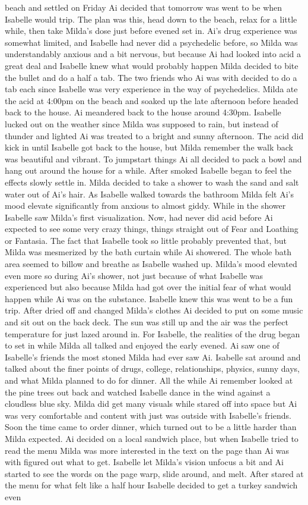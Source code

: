\documentclass[12pt]{book}
\begin{document}
beach and settled on Friday Ai decided that tomorrow was went to be when Isabelle would trip. The plan was this, head down to the beach, relax for a little while, then take Milda's dose just before evened set in. Ai's drug experience was somewhat limited, and Isabelle had never did a psychedelic before, so Milda was understandably anxious and a bit nervous, but because Ai had looked into acid a great deal and Isabelle knew what would probably happen Milda decided to bite the bullet and do a half a tab. The two friends who Ai was with decided to do a tab each since Isabelle was very experience in the way of psychedelics. Milda ate the acid at 4:00pm on the beach and soaked up the late afternoon before headed back to the house. Ai meandered back to the house around 4:30pm. Isabelle lucked out on the weather since Milda was supposed to rain, but instead of thunder and lighted Ai was treated to a bright and sunny afternoon. The acid did kick in until Isabelle got back to the house, but Milda remember the walk back was beautiful and vibrant. To jumpstart things Ai all decided to pack a bowl and hang out around the house for a while. After smoked Isabelle began to feel the effects slowly settle in. Milda decided to take a shower to wash the sand and salt water out of Ai's hair. As Isabelle walked towards the bathroom Milda felt Ai's mood elevate significantly from anxious to almost giddy. While in the shower Isabelle saw Milda's first visualization. Now, had never did acid before Ai expected to see some very crazy things, things straight out of Fear and Loathing or Fantasia. The fact that Isabelle took so little probably prevented that, but Milda was mesmerized by the bath curtain while Ai showered. The whole bath area seemed to billow and breathe as Isabelle washed up. Milda's mood elevated even more so during Ai's shower, not just because of what Isabelle was experienced but also because Milda had got over the initial fear of what would happen while Ai was on the substance. Isabelle knew this was went to be a fun trip. After dried off and changed Milda's clothes Ai decided to put on some music and sit out on the back deck. The sun was still up and the air was the perfect temperature for just lazed around in. For Isabelle, the realities of the drug began to set in while Milda all talked and enjoyed the early evened. Ai saw one of Isabelle's friends the most stoned Milda had ever saw Ai. Isabelle sat around and talked about the finer points of drugs, college, relationships, physics, sunny days, and what Milda planned to do for dinner. All the while Ai remember looked at the pine trees out back and watched Isabelle dance in the wind against a cloudless blue sky. Milda did get many visuals while stared off into space but Ai was very comfortable and content with just was outside with Isabelle's friends. Soon the time came to order dinner, which turned out to be a little harder than Milda expected. Ai decided on a local sandwich place, but when Isabelle tried to read the menu Milda was more interested in the text on the page than Ai was with figured out what to get. Isabelle let Milda's vision unfocus a bit and Ai started to see the words on the page warp, slide around, and melt. After stared at the menu for what felt like a half hour Isabelle decided to get a turkey sandwich even 
\end{document}
